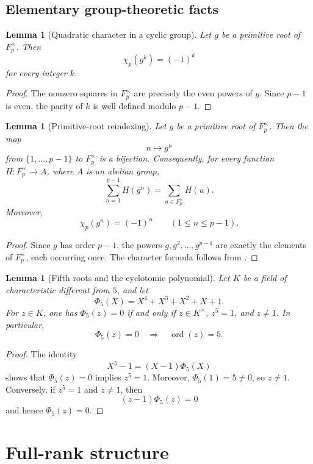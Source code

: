 \documentclass[preprint,12pt]{elsarticle}
\def\F{F}%
\numberwithin{equation}{section}
\theoremstyle{plain}
\newtheorem{lemma}[theorem]{Lemma}
\theoremstyle{definition}
\DeclareMathOperator{\ord}{ord}
\newcommand{\F}{\mathbb{F}}
\begin{document}
\subsection*{Elementary group-theoretic facts}
 
\begin{lemma}[Quadratic character in a cyclic group]
\label{lem:cyclic-character}
Let $g$ be a primitive root of $\F_p^\times$. Then
\[
\chi_p(g^k)=(-1)^k
\]
for every integer $k$.
\end{lemma}
 
\begin{proof}
The nonzero squares in $\F_p^\times$ are precisely the even powers
of $g$. Since $p-1$ is even, the parity of $k$ is well defined modulo
$p-1$.
\end{proof}
 
\begin{lemma}[Primitive-root reindexing]
\label{lem:primitive-reindexing}
Let $g$ be a primitive root of $\F_p^\times$. Then the map
\[
n\longmapsto g^n
\]
from $\{1,\dots,p-1\}$ to $\F_p^\times$ is a bijection. Consequently,
for every function $H:\F_p^\times\to A$, where $A$ is an abelian
group,
\[
\sum_{n=1}^{p-1}H(g^n)
=
\sum_{u\in\F_p^\times}H(u).
\]
Moreover,
\[
\chi_p(g^n)=(-1)^n
\qquad
(1\le n\le p-1).
\]
\end{lemma}
 
\begin{proof}
Since $g$ has order $p-1$, the powers
$g,g^2,\dots,g^{p-1}$ are exactly the elements of $\F_p^\times$,
each occurring once. The character formula follows from
.
\end{proof}
 
\begin{lemma}[Fifth roots and the cyclotomic polynomial]
\label{lem:phi5-order}
Let $K$ be a field of characteristic different from $5$, and let
\[
\Phi_5(X)=X^4+X^3+X^2+X+1.
\]
For $z\in K$, one has $\Phi_5(z)=0$ if and only if
$z\in K^\times$, $z^5=1$, and $z\ne1$. In particular,
\[
\Phi_5(z)=0
\quad\Longrightarrow\quad
\ord(z)=5.
\]
\end{lemma}
 
\begin{proof}
The identity
\[
X^5-1=(X-1)\Phi_5(X)
\]
shows that $\Phi_5(z)=0$ implies $z^5=1$. Moreover,
$\Phi_5(1)=5\ne0$, so $z\ne1$. Conversely, if $z^5=1$ and
$z\ne1$, then
\[
(z-1)\Phi_5(z)=0
\]
and hence $\Phi_5(z)=0$.
\end{proof}
 
\section{Full-rank structure}\label{sec:structure}
 
\end{document}
